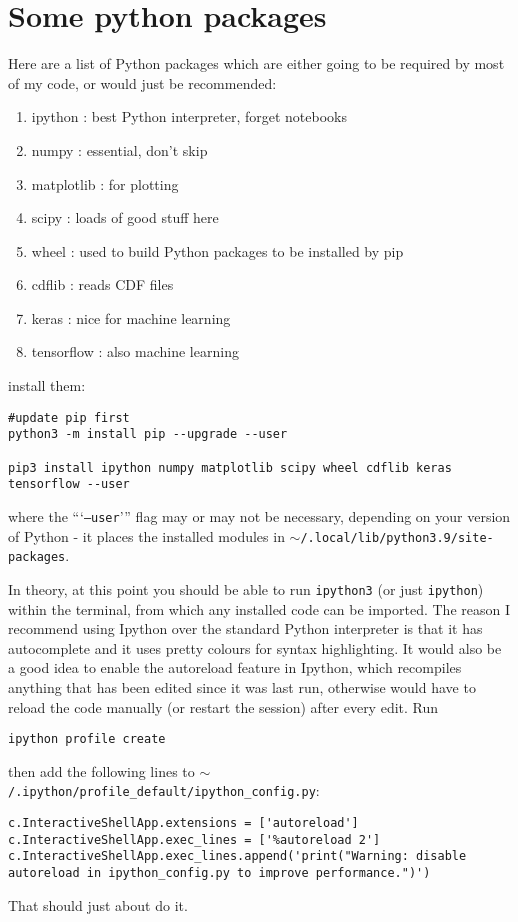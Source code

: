 	\section{Some python packages}

		Here are a list of Python packages which are either going to be required by most of my code, or would just be recommended:
		\begin{enumerate}
			\item ipython : best Python interpreter, forget notebooks
			\item numpy : essential, don't skip
			\item matplotlib : for plotting
			\item scipy : loads of good stuff here
			\item wheel : used to build Python packages to be installed by pip
			\item cdflib : reads CDF files
			\item keras : nice for machine learning
			\item tensorflow : also machine learning
		\end{enumerate}
		install them:
		\begin{verbatim}
#update pip first
python3 -m install pip --upgrade --user

pip3 install ipython numpy matplotlib scipy wheel cdflib keras tensorflow --user
		\end{verbatim}
		where the ```\texttt{--user}''' flag may or may not be necessary, depending on your version of Python - it places the installed modules in \texttt{$\sim$/.local/lib/python3.9/site-packages}.

		In theory, at this point you should be able to run \texttt{ipython3} (or just \texttt{ipython}) within the terminal, from which any installed code can be imported. The reason I recommend using Ipython over the standard Python interpreter is that it has autocomplete and it uses pretty colours for syntax highlighting. It would also be a good idea to enable the autoreload feature in Ipython, which recompiles anything that has been edited since it was last run, otherwise would have to reload the code manually (or restart the session) after every edit. Run
		\begin{verbatim}
ipython profile create
		\end{verbatim}
		then add the following lines to \texttt{$\sim$/.ipython/profile\_default/ipython\_config.py}:
		\begin{verbatim}
c.InteractiveShellApp.extensions = ['autoreload']
c.InteractiveShellApp.exec_lines = ['%autoreload 2']
c.InteractiveShellApp.exec_lines.append('print("Warning: disable autoreload in ipython_config.py to improve performance.")')
		\end{verbatim}

		That should just about do it.

